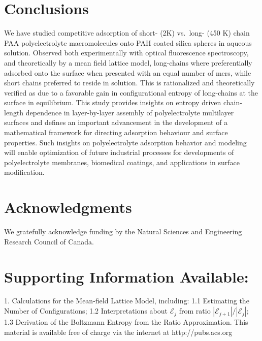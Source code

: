 \documentclass[journal=mamobx,manuscript=article]{achemso}
\begin{document}


\section{Conclusions}

We have studied competitive adsorption of short- (2K) vs.\ long- (450 K) chain PAA polyelectrolyte macromolecules onto PAH coated silica spheres in aqueous solution. Observed both experimentally with optical fluorescence spectroscopy, and theoretically by a mean field lattice model, long-chains where preferentially adsorbed onto the surface when presented with an equal number of mers, while short chains preferred to reside in solution. This is rationalized and theoretically verified as due to a favorable gain in configurational entropy of long-chains at the surface in equilibrium. This study provides insights on entropy driven chain-length dependence in layer-by-layer assembly of polyelectrolyte multilayer surfaces and defines an important advancement in the development of a mathematical framework for directing adsorption behaviour and surface properties. Such insights on polyelectrolyte adsorption behavior and modeling will enable optimization of future industrial processes for developments of polyelectrolyte membranes, biomedical coatings, and applications in surface modification.


\section{Acknowledgments}
We gratefully acknowledge funding by the Natural 
Sciences and Engineering Research Council of Canada.

\section{Supporting Information Available:}
1.  Calculations for the Mean-field Lattice Model, 
including: 1.1 Estimating the Number of Configurations;
1.2 Interpretations about $\mathcal{E}_j$ from 
ratio $|\mathcal{E}_{j+1}|/|\mathcal{E}_j|$;
1.3 Derivation of the Boltzmann Entropy from the 
Ratio Approximation.  This material is available free of
charge via the internet at  http://pubs.acs.org


\end{document}
